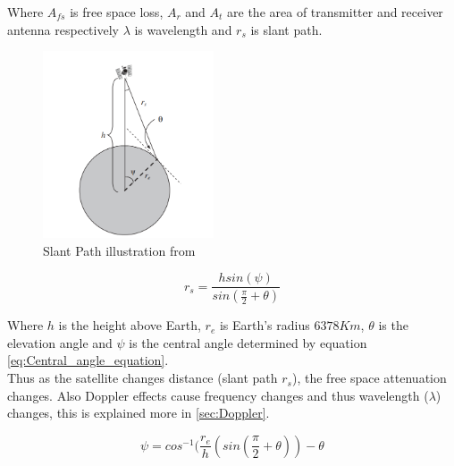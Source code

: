 \documentclass[conference]{IEEEtran}
\begin{document}
Where $A_{fs}$ is free space loss, $A_r$ and $A_t$ are the area of transmitter and receiver antenna respectively $\lambda$ is wavelength and $r_s$ is slant path.\\
\begin{figure}[h]
\centering
	\includegraphics[width = 0.45\textwidth]{Slant_path.png}
	\caption{Slant Path illustration from \cite{seybold_introduction_2005}}
	\label{fig:Slant_path_illustration}
\end{figure}


\begin{equation}
r_s = \frac{h sin(\psi)}{sin(\frac{\pi}{2}+\theta)}
\label{eq:Slant_path_equation}
\end{equation}

Where $h$ is the height above Earth, $r_e$ is Earth's radius $6378K m$, $\theta$ is the elevation angle and $\psi$ is the central angle determined by equation \ref{eq:Central_angle_equation}.\\

Thus as the satellite changes distance (slant path $r_s$), the free space attenuation changes. Also Doppler effects cause frequency changes and thus wavelength ($\lambda$) changes, this is explained more in \ref{sec:Doppler}.  

\begin{equation}
\psi = cos^{-1}(\frac{r_e}{h}(sin(\frac{\pi}{2}+\theta))-\theta
\label{eq:Central_angle_equation}
\end{equation}

\label{sec:Free_space}
\end{document}
